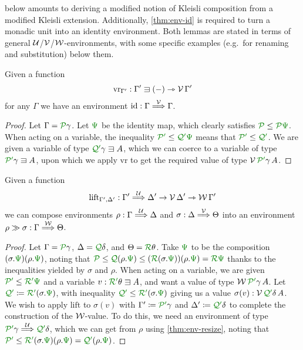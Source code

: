  below amounts to deriving a modified notion of Kleisli
composition from a modified Kleisli extension.
Additionally, \cref{thm:env-id} is required to turn a monadic unit into an
identity environment.
Both lemmas are stated in terms of general $\mathcal U$/$\mathcal V$/$\mathcal W$-environments, with
some specific examples (e.g.\ for renaming and substitution) below them.

\begin{lemma}\label{thm:env-id}
  Given a function
  \[
    \mathrm{vr}_{\Gamma'} :
    \Gamma' \sqni \plr{-} \rightarrowtriangle \V\,\Gamma'
  \]
  for any
  $\Gamma$ we have an environment $\mathrm{id} : \Gamma \stackrel{\mathcal V}\Longrightarrow \Gamma$.
\end{lemma}
\begin{proof}
  Let $\Gamma = \grP\gamma$.
  Let $\gr\Psi$ be the identity map, which clearly satisfies
  $\grP \leq \grP\gr\Psi$.
  When acting on a variable, the inequality $\grPprime \leq \grQprime\gr\Psi$
  means that $\grPprime \leq \grQprime$.
  We are given a variable of type $\grQprime\gamma \sqni A$, which we can
  coerce to a variable of type $\grPprime\gamma \sqni A$, upon which we apply
  $\mathrm{vr}$ to get the required value of type $\V\,\grPprime\gamma\,A$.
\end{proof}

\begin{lemma}\label{thm:env-comp}
  Given a function
  \[
    \mathrm{lift}_{\Gamma', \Delta'} :
    \Gamma' \stackrel{\mathcal U}\Longrightarrow \Delta' \to \mathcal V\,\Delta' \rightarrowtriangle \mathcal W\,\Gamma'
  \]
  we can compose environments $\rho : \Gamma \stackrel{\mathcal U}\Longrightarrow \Delta$ and
  $\sigma : \Delta \stackrel{\mathcal V}\Longrightarrow \Theta$ into an environment
  $\rho \gg \sigma : \Gamma \stackrel{\mathcal W}\Longrightarrow \Theta$.
\end{lemma}
\begin{proof}
  Let $\Gamma = \grP\gamma$, $\Delta = \grQ\delta$, and $\Theta = \grR\theta$.
  Take $\gr\Psi$ to be the composition $\plr{\sigma.\gr\Psi}\plr{\rho.\gr\Psi}$,
  noting that
  $\grP \leq \grQ\plr{\rho.\gr\Psi} \leq
  (\grR\plr{\sigma.\gr\Psi})\plr{\rho.\gr\Psi} = \grR\gr\Psi$
  thanks to the inequalities yielded by $\sigma$ and $\rho$.
  When acting on a variable, we are given $\grPprime \leq \grRprime\gr\Psi$ and
  a variable $v : \grRprime\theta \sqni A$, and want a value of type
  $\W\,\grPprime\gamma\,A$.
  Let $\grQprime \coloneqq \grRprime\plr{\sigma.\gr\Psi}$, with inequality
  $\grQprime \leq \grRprime\plr{\sigma.\gr\Psi}$ giving us a value
  $\sigma(v) : \V\,\grQprime\delta\,A$.
  We wish to apply $\mathrm{lift}$ to $\sigma(v)$ with
  $\Gamma' \coloneqq \grPprime\gamma$ and $\Delta' \coloneqq \grQprime\delta$ to
  complete the construction of the $\mathcal W$-value.
  To do this, we need an environment of type
  $\grPprime\gamma \env\U \grQprime\delta$, which we can get from $\rho$ using
  \cref{thm:env-resize}, noting that
  $\grPprime \leq \grRprime\plr{\sigma.\gr\Psi}\plr{\rho.\gr\Psi} =
  \grQprime\plr{\rho.\gr\Psi}$.
\end{proof}

